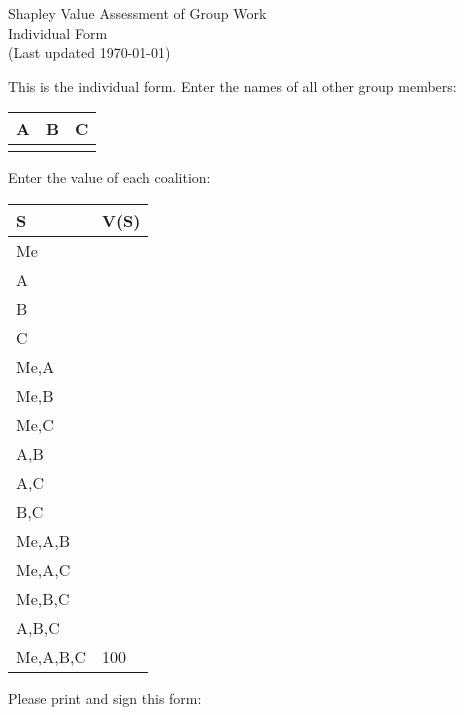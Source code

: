 \documentclass[12pt]{article}
\begin{document}
\begin{center}
\Large{Shapley Value Assessment of Group Work}\\
Individual Form\\
\tiny{(Last updated \today)}
\end{center}
This is the individual form. Enter the names of all other group members:
\vspace{1cm}

\begin{center}
\begin{tabular}{p{3cm}|p{3cm}|p{3cm}}
A&B&C\\
\hline
&&
\end{tabular}
\end{center}
\vspace{1cm}

Enter the value of each coalition:
\vspace{.5cm}

\begin{center}
\begin{tabular}{l|p{2cm}}
S&V(S)\\\hline
Me&\\\hline
A&\\\hline
B&\\\hline
C&\\\hline
Me,A&\\\hline
Me,B&\\\hline
Me,C&\\\hline
A,B&\\\hline
A,C&\\\hline
B,C&\\\hline
Me,A,B&\\\hline
Me,A,C&\\\hline
Me,B,C&\\\hline
A,B,C&\\\hline
Me,A,B,C&100\\\hline
\end{tabular}
\end{center}
\vspace{.5cm}

Please print and sign this form:
\end{document}
